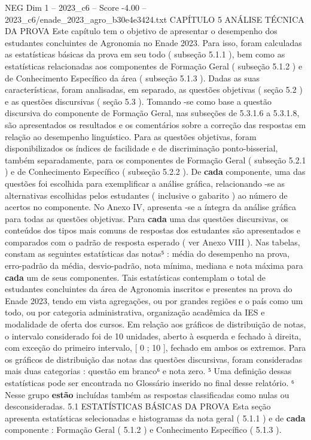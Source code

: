\begin{textsample}{NEG Dim 1 – 2023\_c6 – Score -4.00 – 2023\_c6/enade\_2023\_agro\_b30e4e3424.txt}  \label{ex:f1_neg_205}
CAPÍTULO 5 ANÁLISE TÉCNICA DA PROVA Este capítulo tem o objetivo de apresentar o desempenho dos estudantes concluintes de Agronomia no Enade 2023.
Para isso, foram calculadas as estatísticas básicas da prova em seu todo ( subseção 5.1.1 ), bem como as estatísticas relacionadas aos componentes de Formação Geral ( subseção 5.1.2 ) e de Conhecimento Específico da área ( subseção 5.1.3 ).
Dadas as suas características, foram analisadas, em separado, as questões objetivas ( seção 5.2 ) e as questões discursivas ( seção 5.3 ).
Tomando -se como base a questão discursiva do componente de Formação Geral, nas subseções de 5.3.1.6 a 5.3.1.8, são apresentados os resultados e os comentários sobre a correção das respostas em relação ao desempenho linguístico.
Para as questões objetivas, foram disponibilizados os índices de facilidade e de discriminação ponto-bisserial, também separadamente, para os componentes de Formação Geral ( subseção 5.2.1 ) e de Conhecimento Específico ( subseção 5.2.2 ).
De \textbf{cada} componente, uma das questões foi escolhida para exemplificar a análise gráfica, relacionando -se as alternativas escolhidas pelos estudantes ( inclusive o gabarito ) ao número de acertos no componente.
No Anexo IV, apresenta -se a íntegra da análise gráfica para todas as questões objetivas.
Para \textbf{cada} uma das questões discursivas, os conteúdos dos tipos mais comuns de respostas dos estudantes são apresentados e comparados com o padrão de resposta esperado ( ver Anexo VIII ).
Nas tabelas, constam as seguintes estatísticas das notas⁵ : média do desempenho na prova, erro-padrão da média, desvio-padrão, nota mínima, mediana e nota máxima para \textbf{cada} um de seus componentes.
Tais estatísticas contemplam o total de estudantes concluintes da área de Agronomia inscritos e presentes na prova do Enade 2023, tendo em vista agregações, ou por grandes regiões e o país como um todo, ou por categoria administrativa, organização acadêmica da IES e modalidade de oferta dos cursos.
Em relação aos gráficos de distribuição de notas, o intervalo considerado foi de 10 unidades, aberto à esquerda e fechado à direita, com exceção do primeiro intervalo, [ 0 ; 10 ], fechado em ambos os extremos.
Para os gráficos de distribuição das notas das questões discursivas, foram consideradas mais duas categorias : questão em branco⁶ e nota zero. ⁵ Uma definição dessas estatísticas pode ser encontrada no Glossário inserido no final desse relatório. ⁶ Nesse grupo \textbf{estão} incluídas também as respostas classificadas como nulas ou desconsideradas. 5.1 ESTATÍSTICAS BÁSICAS DA PROVA Esta seção apresenta estatísticas selecionadas e histogramas da nota geral ( 5.1.1 ) e de \textbf{cada} componente : Formação Geral ( 5.1.2 ) e Conhecimento Específico ( 5.1.3 ).

\end{textsample}
